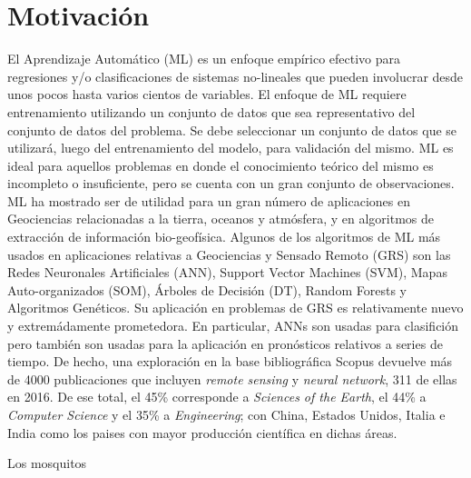 \chapter{Motivación}

El Aprendizaje Automático (ML) es un enfoque empírico efectivo para
regresiones y/o clasificaciones de sistemas no-lineales que pueden involucrar desde
unos pocos hasta varios cientos de variables. El enfoque de ML requiere
entrenamiento utilizando un conjunto de datos que sea representativo del conjunto
de datos del problema. Se debe seleccionar un conjunto de datos que se utilizará,
luego del entrenamiento del modelo, para validación del mismo.
ML es ideal para aquellos problemas en donde el conocimiento teórico del mismo
es incompleto o insuficiente, pero se cuenta con un gran conjunto de observaciones.
ML ha mostrado ser de utilidad para un gran número de aplicaciones en Geociencias
relacionadas a la tierra, oceanos y atmósfera, y en algoritmos de extracción
de información bio-geofísica.
Algunos de los algoritmos de ML más usados en aplicaciones relativas a
Geociencias y Sensado Remoto (GRS) son las Redes Neuronales Artificiales (ANN),
Support Vector Machines (SVM), Mapas Auto-organizados (SOM), Árboles de Decisión (DT),
Random Forests y Algoritmos Genéticos. Su aplicación en problemas de GRS es
relativamente nuevo y extremádamente prometedora. En particular, ANNs son
usadas para clasifición pero también son usadas para la aplicación en pronósticos
relativos a series de tiempo.
De hecho, una exploración en la base bibliográfica Scopus devuelve más de 4000
publicaciones que incluyen \textit{remote sensing} y \textit{neural network},
311 de ellas en 2016. De ese total, el 45\% corresponde a
\textit{Sciences of the Earth}, el 44\% a \textit{Computer Science} y el 35\% a
\textit{Engineering}; con China, Estados Unidos, Italia e India como los paises
con mayor producción científica en dichas áreas.


Los mosquitos

